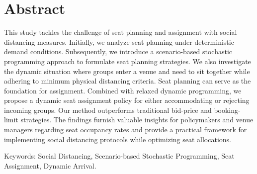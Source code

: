 
\section*{Abstract}
This study tackles the challenge of seat planning and assignment with social distancing measures. Initially, we analyze seat planning under deterministic demand conditions. Subsequently, we introduce a scenario-based stochastic programming approach to formulate seat planning strategies. We also investigate the dynamic situation where groups enter a venue and need to sit together while adhering to minimum physical distancing criteria. Seat planning can serve as the foundation for assignment. Combined with relaxed dynamic programming, we propose a dynamic seat assignment policy for either accommodating or rejecting incoming groups. Our method outperforms traditional bid-price and booking-limit strategies. The findings furnish valuable insights for policymakers and venue managers regarding seat occupancy rates and provide a practical framework for implementing social distancing protocols while optimizing seat allocations.


Keywords: Social Distancing, Scenario-based Stochastic Programming, Seat Assignment, Dynamic Arrival.


